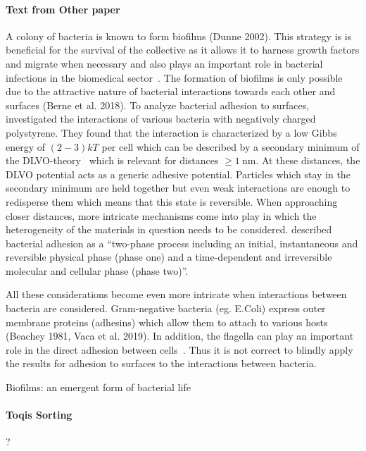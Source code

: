 \documentclass{article}
\begin{document}
\paragraph{Text from Other paper}
A colony of bacteria is known to form biofilms (Dunne 2002). This strategy is is beneficial for the
survival of the collective as it allows it to harness growth factors and migrate when necessary and
also plays an important role in bacterial infections in the biomedical sector~\cite{Ong1999}.
The formation of biofilms is only possible due to the attractive nature of bacterial interactions
towards each other and surfaces (Berne et al. 2018). To analyze bacterial adhesion to surfaces,
\cite{vanLoosdrecht1989} investigated the interactions of various bacteria with negatively charged
polystyrene.
They found that the interaction is characterized by a low Gibbs energy of $(2 - 3)kT$ per cell
which can be described by a secondary minimum of the DLVO-theory~\cite{Verwey1947,Derjaguin1993}
which is relevant for distances $\geq\SI{1}{\nano\meter}$.
At these distances, the DLVO potential acts as a generic adhesive potential.
Particles which stay in the secondary minimum are held together but even weak interactions are
enough to redisperse them which means that this state is reversible.
When approaching closer distances, more intricate mechanisms come into play in which the
heterogeneity of the materials in question needs to be considered.
\cite{Hori2010} described bacterial adhesion as a “two-phase process including an initial,
instantaneous and reversible physical phase (phase one) and a time-dependent and irreversible
molecular and cellular phase (phase two)”.

All these considerations become even more intricate when interactions between bacteria are considered.
Gram-negative bacteria (eg. E.Coli) express outer membrane proteins (adhesins) which allow them to
attach to various hosts (Beachey 1981, Vaca et al. 2019).
In addition, the flagella can play an important role in the direct adhesion between
cells~\cite{Haiko2013}.
Thus it is not correct to blindly apply the results for adhesion to surfaces to the interactions
between bacteria.

Biofilms: an emergent form of bacterial life \cite{Flemming2016}

\paragraph{Toqis Sorting} ?
\end{document}
